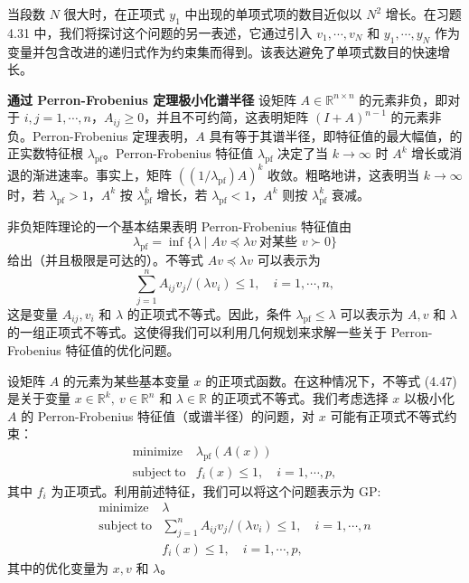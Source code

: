 \documentclass[UTF8,12pt,a4paper,fontset=fandol]{ctexart}
\begin{document}
当段数 $N$ 很大时，在正项式 $y_1$ 中出现的单项式项的数目近似以 $N^2$ 增长。在习题 4.31 中，我们将探讨这个问题的另一表述，它通过引入 $v_1,\cdots,v_N$ 和 $y_1,\cdots,y_N$ 作为变量并包含改进的递归式作为约束集而得到。该表达避免了单项式数目的快速增长。

\noindent\textbf{通过 Perron-Frobenius 定理极小化谱半径}\quad
设矩阵 $A\in\mathbb{R}^{n\times n}$ 的元素非负，即对于 $i,j=1,\cdots,n$，$A_{ij}\geq 0$，并且不可约简，这表明矩阵 $(I+A)^{n-1}$ 的元素非负。Perron-Frobenius 定理表明，$A$ 具有等于其谱半径，即特征值的最大幅值，的正实数特征根 $\lambda_{\mathrm{pf}}$。Perron-Frobenius 特征值 $\lambda_{\mathrm{pf}}$ 决定了当 $k\to\infty$ 时 $A^k$ 增长或消退的渐进速率。事实上，矩阵 $((1/\lambda_{\mathrm{pf}})A)^k$ 收敛。粗略地讲，这表明当 $k\to\infty$ 时，若 $\lambda_{\mathrm{pf}}>1$，$A^k$ 按 $\lambda_{\mathrm{pf}}^k$ 增长，若 $\lambda_{\mathrm{pf}}<1$，$A^k$ 则按 $\lambda_{\mathrm{pf}}^k$ 衰减。

非负矩阵理论的一个基本结果表明 Perron-Frobenius 特征值由
\[
\lambda_{\mathrm{pf}}=\inf\{\lambda\mid Av\preceq \lambda v\ \text{对某些 }v\succ 0\}
\]
给出（并且极限是可达的）。不等式 $Av\preceq \lambda v$ 可以表示为
\begin{equation}
\sum_{j=1}^n A_{ij}v_j/(\lambda v_i)\leq 1,\quad i=1,\cdots,n,
\tag{4.47}
\end{equation}
这是变量 $A_{ij},v_i$ 和 $\lambda$ 的正项式不等式。因此，条件 $\lambda_{\mathrm{pf}}\leq \lambda$ 可以表示为 $A,v$ 和 $\lambda$ 的一组正项式不等式。这使得我们可以利用几何规划来求解一些关于 Perron-Frobenius 特征值的优化问题。

设矩阵 $A$ 的元素为某些基本变量 $x$ 的正项式函数。在这种情况下，不等式 (4.47) 是关于变量 $x\in\mathbb{R}^k,\ v\in\mathbb{R}^n$ 和 $\lambda\in\mathbb{R}$ 的正项式不等式。我们考虑选择 $x$ 以极小化 $A$ 的 Perron-Frobenius 特征值（或谱半径）的问题，对 $x$ 可能有正项式不等式约束：
\[
\begin{array}{ll}
\mathop{\mathrm{minimize}} & \lambda_{\mathrm{pf}}(A(x))\\
\mathrm{subject\ to} & f_i(x)\leq 1,\quad i=1,\cdots,p,
\end{array}
\]
其中 $f_i$ 为正项式。利用前述特征，我们可以将这个问题表示为 GP:
\[
\begin{array}{ll}
\mathop{\mathrm{minimize}} & \lambda\\
\mathrm{subject\ to} & \displaystyle\sum_{j=1}^n A_{ij}v_j/(\lambda v_i)\leq 1,\quad i=1,\cdots,n\\
& f_i(x)\leq 1,\quad i=1,\cdots,p,
\end{array}
\]
其中的优化变量为 $x,v$ 和 $\lambda$。
\end{document}
